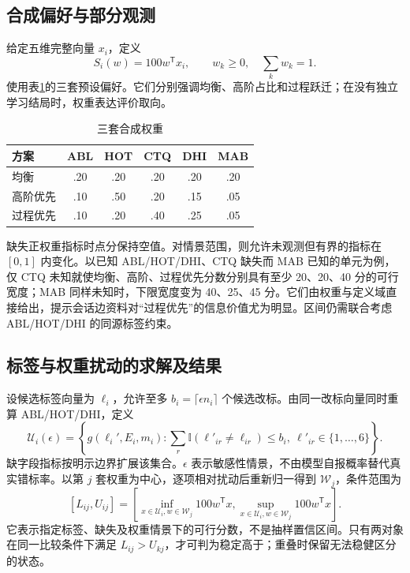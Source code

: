 \documentclass[withoutpreface,bwprint]{cumcmthesis}
\newcommand{\ind}{\mathbb{I}}
\begin{document}
\subsection{合成偏好与部分观测}
给定五维完整向量 $x_i$，定义
\begin{equation}\label{eq:aiv}
S_i(w)=100w^\mathsf Tx_i,\qquad w_k\ge0,\quad\sum_kw_k=1.
\end{equation}
使用表\ref{tab:weights}的三套预设偏好。它们分别强调均衡、高阶占比和过程跃迁；在没有独立学习结局时，权重表达评价取向。
\begin{table}[htbp]\centering\small
\caption{三套合成权重}\label{tab:weights}
\begin{tabular}{@{}lccccc@{}}\toprule
方案 & ABL & HOT & CTQ & DHI & MAB\\\midrule
均衡 & .20 & .20 & .20 & .20 & .20\\
高阶优先 & .10 & .50 & .20 & .15 & .05\\
过程优先 & .10 & .20 & .40 & .25 & .05\\\bottomrule
\end{tabular}
\end{table}

\FinalAvailabilityResults{}

缺失正权重指标时点分保持空值。对情景范围，则允许未观测但有界的指标在 $[0,1]$ 内变化。以已知 ABL/HOT/DHI、CTQ 缺失而 MAB 已知的单元为例，仅 CTQ 未知就使均衡、高阶、过程优先分数分别具有至少 20、20、40 分的可行宽度；MAB 同样未知时，下限宽度变为 40、25、45 分。它们由权重与定义域直接给出，提示会话边资料对“过程优先”的信息价值尤为明显。区间仍需联合考虑 ABL/HOT/DHI 的同源标签约束。

\subsection{标签与权重扰动的求解及结果}
设候选标签向量为 $\ell_i$，允许至多 $b_i=\lceil\epsilon n_i\rceil$ 个候选改标。由同一改标向量同时重算 ABL/HOT/DHI，定义
\begin{equation}\label{eq:jointset}
\mathcal U_i(\epsilon)=\left\{g(\ell_i',E_i,m_i):\sum_r\ind(\ell'_{ir}\ne\ell_{ir})\le b_i,
\ \ell'_{ir}\in\{1,\ldots,6\}\right\}.
\end{equation}
缺字段指标按明示边界扩展该集合。$\epsilon$ 表示敏感性情景，不由模型自报概率替代真实错标率。以第 $j$ 套权重为中心，逐项相对扰动后重新归一得到 $\mathcal W_j$，条件范围为
\begin{equation}\label{eq:interval}
[L_{ij},U_{ij}]=\left[\inf_{x\in\mathcal U_i,w\in\mathcal W_j}100w^\mathsf Tx,
\sup_{x\in\mathcal U_i,w\in\mathcal W_j}100w^\mathsf Tx\right].
\end{equation}
它表示指定标签、缺失及权重情景下的可行分数，不是抽样置信区间。只有两对象在同一比较条件下满足 $L_{ij}>U_{kj}$，才可判为稳定高于；重叠时保留无法稳健区分的状态。
\end{document}

